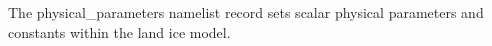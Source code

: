 The physical\_parameters namelist record sets scalar physical parameters and constants within the land ice model.
